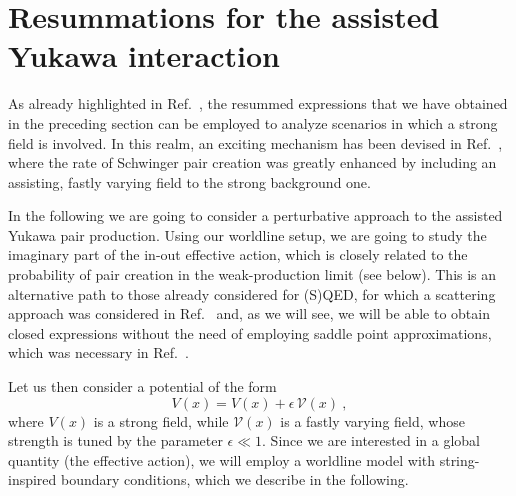 \documentclass[12pt,a4paper]{article}
\numberwithin{equation}{section}
\numberwithin{equation}{section}
\begin{document}
\section{Resummations for the assisted Yukawa interaction} \label{sec:assisted_yukawa}
As already highlighted in Ref.~\cite{Franchino-Vinas:2023wea}, the resummed expressions that we have obtained in the preceding section can be employed to analyze scenarios in which a strong field is involved.
In this realm, an exciting mechanism has been devised in Ref.~\cite{Schutzhold:2008pz}, where the rate of Schwinger pair creation was greatly enhanced by including an assisting, fastly varying field to the strong background one. 

In the following we are going to consider a perturbative approach to the assisted Yukawa pair production.
Using our worldline setup, we are going to study the imaginary part of the in-out effective action, which is closely related to the probability of pair creation in the weak-production limit (see below). This is an alternative path to those already considered for (S)QED, for which a scattering approach was considered in Ref.~\cite{Torgrimsson:2017pzs} and, as we will see, we will be able to obtain closed expressions without the need of employing saddle point approximations, which was necessary in Ref.~\cite{Torgrimsson:2018xdf}.

Let us then consider a potential of the form
\begin{equation}
 V(x)= V(x) +\epsilon \, \mathcal{V}(x) \ ,
\end{equation}
where $ V(x)$ is a strong field, while $\mathcal{V}(x)$ is a fastly varying field, whose strength is tuned by the parameter $\epsilon\ll 1$. 
Since we are interested in a global quantity (the effective action), we will employ a worldline model with string-inspired boundary conditions, which we describe in the following.
\end{document}
